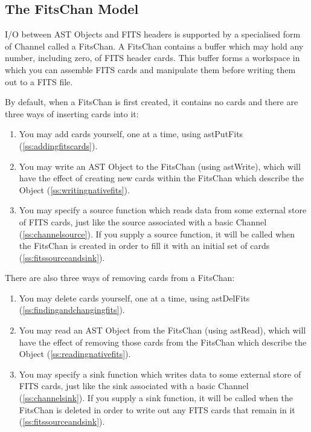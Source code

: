 \documentclass[twoside,11pt]{article}
\newcommand{\htmlref}[2]{#1}
\newcommand{\secref}[1]{\S\ref{#1}}
\renewcommand{\secref}[1]{\ref{#1}}
\begin{document}
\subsection{The FitsChan Model}

I/O between AST Objects and FITS headers is supported by a specialised
form of \htmlref{Channel}{Channel} called a \htmlref{FitsChan}{FitsChan}. A FitsChan contains a buffer which
may hold any number, including zero, of FITS header cards. This buffer
forms a workspace in which you can assemble FITS cards and manipulate
them before writing them out to a FITS file.

By default, when a FitsChan is first created, it contains no cards and
there are three ways of inserting cards into it:

\begin{enumerate}
\item You may add cards yourself, one at a time, using \htmlref{astPutFits}{astPutFits}
(\secref{ss:addingfitscards}).

\item You may write an AST \htmlref{Object}{Object} to the FitsChan (using \htmlref{astWrite}{astWrite}),
which will have the effect of creating new cards within the FitsChan
which describe the Object (\secref{ss:writingnativefits}).

\item You may specify a source function which reads data from some
external store of FITS cards, just like the source associated with a
basic Channel (\secref{ss:channelsource}). If you supply a source
function, it will be called when the FitsChan is created in order to
fill it with an initial set of cards (\secref{ss:fitssourceandsink}).
\end{enumerate}

There are also three ways of removing cards from a FitsChan:

\begin{enumerate}
\item You may delete cards yourself, one at a time, using \htmlref{astDelFits}{astDelFits}
(\secref{ss:findingandchangingfits}).

\item You may read an AST Object from the FitsChan (using \htmlref{astRead}{astRead}),
which will have the effect of removing those cards from the FitsChan
which describe the Object (\secref{ss:readingnativefits}).

\item You may specify a sink function which writes data to some
external store of FITS cards, just like the sink associated with a
basic Channel (\secref{ss:channelsink}). If you supply a sink function,
it will be called when the FitsChan is deleted in order to write out
any FITS cards that remain in it (\secref{ss:fitssourceandsink}).
\end{enumerate}
 
\end{document}
